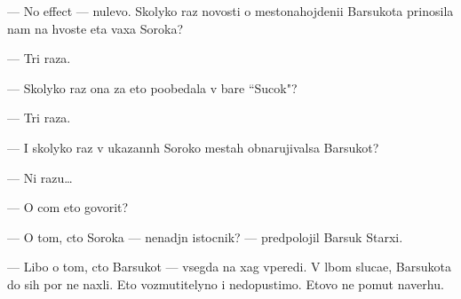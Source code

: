 \documentclass[12pt]{book}
\begin{document}
— No effect — nulevo{\y}. Skolyko raz novosti o mestonahojdeni{\y}i Barsukota prinosila nam na hvoste eta vaxa Soroka?

— Tri raza.

— Skolyko raz ona za eto poobedala v bare ``Sucok"?

— Tri raza.

— I skoly\-ko raz v ukazann{\yi}h Soroko{\y} mestah obnarujivalsa Barsukot?

— Ni razu…

— O com eto govorit?

— O tom, cto Soroka — nenad{\e}jn{\yi}{\y} istocnik? — predpolojil Barsuk Starxi{\y}.

— Libo o tom, cto Barsukot — vsegda na xag vperedi. V l{\io}bom sluca{\y}e, Barsukota do sih por ne naxli. Eto vozmutitelyno i nedopustimo. Etovo ne po{\y}mut naverhu. 
\end{document}
